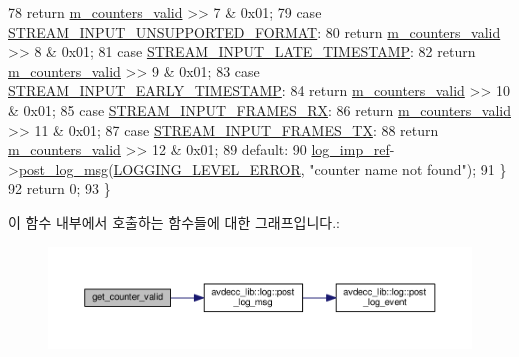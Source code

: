\begin{DoxyCode}
78         \textcolor{keywordflow}{return} \hyperlink{classavdecc__lib_1_1stream__input__counters__response__imp_ab528aa8ed91b0a6453238e605c451ce8}{m\_counters\_valid} >> 7 & 0x01;
79     \textcolor{keywordflow}{case} \hyperlink{namespaceavdecc__lib_a831be56dba8ac423258a9374a1202df4a5a8fc53c8728128a42eacecfd7b0b767}{STREAM\_INPUT\_UNSUPPORTED\_FORMAT}:
80         \textcolor{keywordflow}{return} \hyperlink{classavdecc__lib_1_1stream__input__counters__response__imp_ab528aa8ed91b0a6453238e605c451ce8}{m\_counters\_valid} >> 8 & 0x01;
81     \textcolor{keywordflow}{case} \hyperlink{namespaceavdecc__lib_a831be56dba8ac423258a9374a1202df4a5c1b67849a2f0369eacd9cb0a34cd35b}{STREAM\_INPUT\_LATE\_TIMESTAMP}:
82         \textcolor{keywordflow}{return} \hyperlink{classavdecc__lib_1_1stream__input__counters__response__imp_ab528aa8ed91b0a6453238e605c451ce8}{m\_counters\_valid} >> 9 & 0x01;
83     \textcolor{keywordflow}{case} \hyperlink{namespaceavdecc__lib_a831be56dba8ac423258a9374a1202df4a275f10a1321b0f35ad3a85706c9a2992}{STREAM\_INPUT\_EARLY\_TIMESTAMP}:
84         \textcolor{keywordflow}{return} \hyperlink{classavdecc__lib_1_1stream__input__counters__response__imp_ab528aa8ed91b0a6453238e605c451ce8}{m\_counters\_valid} >> 10 & 0x01;
85     \textcolor{keywordflow}{case} \hyperlink{namespaceavdecc__lib_a831be56dba8ac423258a9374a1202df4ab39ecebabdd284a4a76d165ce5ed661d}{STREAM\_INPUT\_FRAMES\_RX}:
86         \textcolor{keywordflow}{return} \hyperlink{classavdecc__lib_1_1stream__input__counters__response__imp_ab528aa8ed91b0a6453238e605c451ce8}{m\_counters\_valid} >> 11 & 0x01;
87     \textcolor{keywordflow}{case} \hyperlink{namespaceavdecc__lib_a831be56dba8ac423258a9374a1202df4a0b0a7b71f908ef6d8bbafd7d9a36ec57}{STREAM\_INPUT\_FRAMES\_TX}:
88         \textcolor{keywordflow}{return} \hyperlink{classavdecc__lib_1_1stream__input__counters__response__imp_ab528aa8ed91b0a6453238e605c451ce8}{m\_counters\_valid} >> 12 & 0x01;
89     \textcolor{keywordflow}{default}:
90         \hyperlink{namespaceavdecc__lib_acbe3e2a96ae6524943ca532c87a28529}{log\_imp\_ref}->\hyperlink{classavdecc__lib_1_1log_a68139a6297697e4ccebf36ccfd02e44a}{post\_log\_msg}(\hyperlink{namespaceavdecc__lib_a501055c431e6872ef46f252ad13f85cdaf2c4481208273451a6f5c7bb9770ec8a}{LOGGING\_LEVEL\_ERROR}, \textcolor{stringliteral}{"counter
       name not found"});
91     \}
92     \textcolor{keywordflow}{return} 0;
93 \}
\end{DoxyCode}


이 함수 내부에서 호출하는 함수들에 대한 그래프입니다.\+:
\nopagebreak
\begin{figure}[H]
\begin{center}
\leavevmode
\includegraphics[width=350pt]{classavdecc__lib_1_1stream__input__counters__response__imp_a192c298bbf4dbeef7d3d88d892732455_cgraph}
\end{center}
\end{figure}




